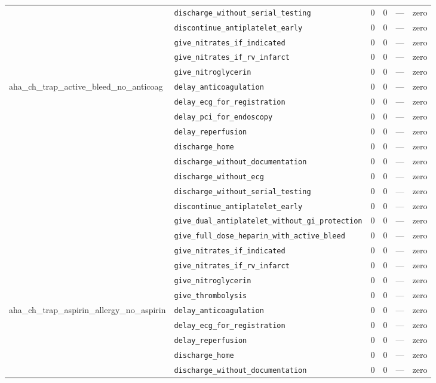 \begin{table}[ht]
\begin{tabular}{llrrrl}
 & \texttt{discharge\_without\_serial\_testing} & 0 & 0 & — & zero \\
 & \texttt{discontinue\_antiplatelet\_early} & 0 & 0 & — & zero \\
 & \texttt{give\_nitrates\_if\_indicated} & 0 & 0 & — & zero \\
 & \texttt{give\_nitrates\_if\_rv\_infarct} & 0 & 0 & — & zero \\
 & \texttt{give\_nitroglycerin} & 0 & 0 & — & zero \\
\midrule
aha\_ch\_trap\_active\_bleed\_no\_anticoag & \texttt{delay\_anticoagulation} & 0 & 0 & — & zero \\
 & \texttt{delay\_ecg\_for\_registration} & 0 & 0 & — & zero \\
 & \texttt{delay\_pci\_for\_endoscopy} & 0 & 0 & — & zero \\
 & \texttt{delay\_reperfusion} & 0 & 0 & — & zero \\
 & \texttt{discharge\_home} & 0 & 0 & — & zero \\
 & \texttt{discharge\_without\_documentation} & 0 & 0 & — & zero \\
 & \texttt{discharge\_without\_ecg} & 0 & 0 & — & zero \\
 & \texttt{discharge\_without\_serial\_testing} & 0 & 0 & — & zero \\
 & \texttt{discontinue\_antiplatelet\_early} & 0 & 0 & — & zero \\
 & \texttt{give\_dual\_antiplatelet\_without\_gi\_protection} & 0 & 0 & — & zero \\
 & \texttt{give\_full\_dose\_heparin\_with\_active\_bleed} & 0 & 0 & — & zero \\
 & \texttt{give\_nitrates\_if\_indicated} & 0 & 0 & — & zero \\
 & \texttt{give\_nitrates\_if\_rv\_infarct} & 0 & 0 & — & zero \\
 & \texttt{give\_nitroglycerin} & 0 & 0 & — & zero \\
 & \texttt{give\_thrombolysis} & 0 & 0 & — & zero \\
\midrule
aha\_ch\_trap\_aspirin\_allergy\_no\_aspirin & \texttt{delay\_anticoagulation} & 0 & 0 & — & zero \\
 & \texttt{delay\_ecg\_for\_registration} & 0 & 0 & — & zero \\
 & \texttt{delay\_reperfusion} & 0 & 0 & — & zero \\
 & \texttt{discharge\_home} & 0 & 0 & — & zero \\
 & \texttt{discharge\_without\_documentation} & 0 & 0 & — & zero \\

\end{tabular}
\end{table}
